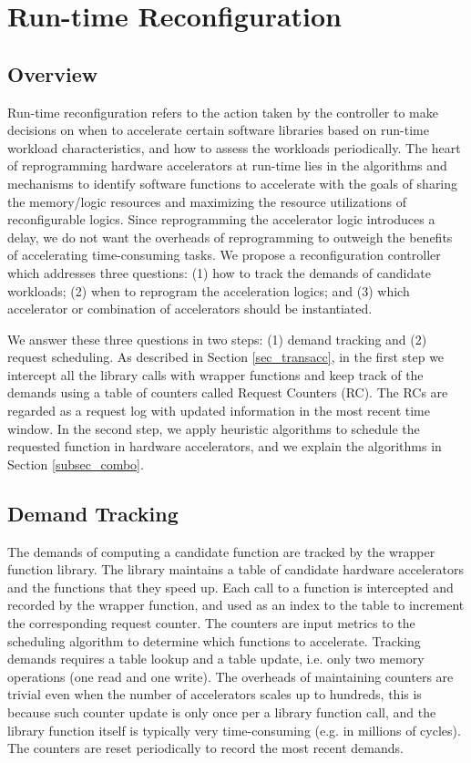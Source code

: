 \section{Run-time Reconfiguration }
\label{sec_runtime_reconfig}

\subsection{Overview}
\label{subsec_runtime_reconfig_overview}

Run-time reconfiguration refers to the action taken by the controller
to make decisions on when to accelerate certain software libraries
based on run-time workload characteristics, and how to assess the
workloads periodically. The heart of reprogramming hardware
accelerators at run-time lies in the algorithms and mechanisms to
identify software functions to accelerate with the goals of sharing
the memory/logic resources and maximizing the resource utilizations of
reconfigurable logics. Since reprogramming the accelerator logic 
introduces a delay, we do not want the overheads of
reprogramming to outweigh the benefits of accelerating time-consuming
tasks. We propose a reconfiguration controller which addresses three
questions: (1) how to track the demands of candidate workloads; (2)
when to reprogram the acceleration logics; and (3) which accelerator
or combination of accelerators should be instantiated.


We answer these three questions in two steps:
(1) demand tracking and (2) request scheduling. As described in
Section \ref{sec_transacc}, in the first step we intercept all the
library calls with wrapper functions and keep track of the demands
using a table of counters called Request Counters (RC). The RCs
are regarded as a request log with updated information in the most
recent time window. In the second step, we apply heuristic algorithms to
schedule the requested function in hardware accelerators, and we
explain the algorithms in Section \ref{subsec_combo}. 

\subsection{Demand Tracking} 

The demands of computing a candidate function are tracked by the
wrapper function library. The library maintains a table of candidate
hardware accelerators and the functions that they speed up. Each call
to a function is intercepted and recorded by the wrapper function, and used as an
index to the table to increment the corresponding request counter. The
counters are input metrics to the scheduling algorithm to determine which
functions to accelerate. Tracking demands requires a table
lookup and a table update, i.e. only two memory operations (one
read and one write). The overheads of maintaining counters are trivial even when the number
of accelerators scales up to hundreds, this is because such counter
update is only once per a library function call, and the library function itself is typically very time-consuming (e.g. in millions of cycles). The counters
are reset periodically to record the most recent demands. 


